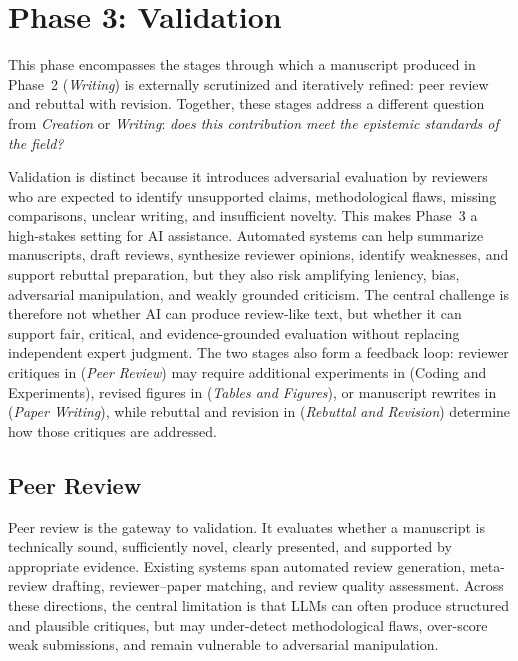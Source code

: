 \section{Phase 3: Validation}
\label{sec:validation}

This phase encompasses the stages through which a manuscript produced in Phase~2 (\emph{Writing}) is externally scrutinized and iteratively refined: peer review and rebuttal with revision. Together, these stages address a different question from \emph{Creation} or \emph{Writing}: \emph{does this contribution meet the epistemic standards of the field?}

Validation is distinct because it introduces adversarial evaluation by reviewers who are expected to identify unsupported claims, methodological flaws, missing comparisons, unclear writing, and insufficient novelty. This makes Phase~3 a high-stakes setting for AI assistance. Automated systems can help summarize manuscripts, draft reviews, synthesize reviewer opinions, identify weaknesses, and support rebuttal preparation, but they also risk amplifying leniency, bias, adversarial manipulation, and weakly grounded criticism. The central challenge is therefore not whether AI can produce review-like text, but whether it can support fair, critical, and evidence-grounded evaluation without replacing independent expert judgment. The two stages also form a feedback loop: reviewer critiques in \Ssix (\emph{Peer Review}) may require additional experiments in \Sthree (Coding and Experiments), revised figures in \Sfour (\emph{Tables and Figures}), or manuscript rewrites in \Sfive (\emph{Paper Writing}), while rebuttal and revision in \Sseven (\emph{Rebuttal and Revision}) determine how those critiques are addressed.



\subsection{Peer Review}
\label{sec:peer_review}

Peer review is the gateway to validation. It evaluates whether a manuscript is technically sound, sufficiently novel, clearly presented, and supported by appropriate evidence. Existing systems span automated review generation, meta-review drafting, reviewer--paper matching, and review quality assessment. Across these directions, the central limitation is that LLMs can often produce structured and plausible critiques, but may under-detect methodological flaws, over-score weak submissions, and remain vulnerable to adversarial manipulation. 

